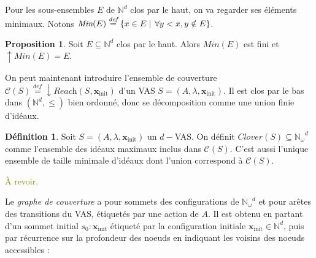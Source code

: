 \documentclass[a4paper,final]{article}
\theoremstyle{definition}
\newtheorem{Definition}[Theorem]{Définition}
\newtheorem{Proposition}[Theorem]{Proposition}
\let\leq\leqslant
\newcommand{\alain}[1]{\textcolor{blue}{#1}}
\newcommand{\lucas}[1]{\textcolor{olive}{#1}}
\newcommand{\set}[2]{\left\{#1\mathrel{\left|\vphantom{#1}\vphantom{#2}\right.}#2\right\}}
\newcommand{\defeq}{\ensuremath{\stackrel{\textit{def}}{=}}}
\newcommand{\Min}{\textit{Min}}
\newcommand{\N}{\ensuremath{\mathbb{N}}}
\newcommand{\Nomega}{\ensuremath{\mathbb{N}_\omega}}
\newcommand{\reach}{\ensuremath{\textit{Reach}}}
\newcommand{\cover}{\ensuremath{\mathcal{C}}}
\newcommand{\clover}{\textit{Clover}}
\newcommand{\vect}[1]{\ensuremath{\mathbf{#1}}}
\newcommand{\xinit}{\ensuremath{\vect{x}_\text{init}}}
\begin{document}
\vspace{5mm}
Pour les sous-ensembles $E$ de $\N^d$ clos par le haut, on va regarder ses éléments minimaux.
Notons $\Min(E) \defeq \set{x\in E}{\forall y < x, y \notin E}$.

\begin{Proposition}%
Soit $E\subseteq \N^d$ clos par le haut.
Alors $\Min(E)$ est fini et $\uparrow \Min(E) = E$.
\end{Proposition}

On peut maintenant introduire l'ensemble de couverture $\cover(S) \defeq \downarrow \reach(S,\xinit)$ d'un VAS $S = (A,\lambda,\xinit)$.
Il est clos par le bas dans $(\N^d,\leq)$ bien ordonné, donc se décomposition comme une union finie d'idéaux.


\begin{Definition}
Soit $S=(A,\lambda,\xinit)$ un $d-$VAS.
On définit $\clover(S) \subseteq \Nomega^d$ comme l'ensemble des idéaux maximaux inclus dans $\cover(S)$.
C'est aussi l'unique ensemble de taille minimale d'idéaux dont l'union correspond à $\cover(S)$.
\end{Definition}


\lucas{À revoir.}

Le \emph{graphe de couverture} a pour sommets des configurations de $\Nomega^d$ et pour arêtes des transitions du VAS, étiquetés par une action de $A$.
Il est obtenu en partant d'un sommet initial $s_0:\xinit$ étiqueté par la configuration initiale $\xinit\in \N^d$, puis par récurrence sur la profondeur des noeuds en indiquant les voisins des noeuds accessibles :
\end{document}
